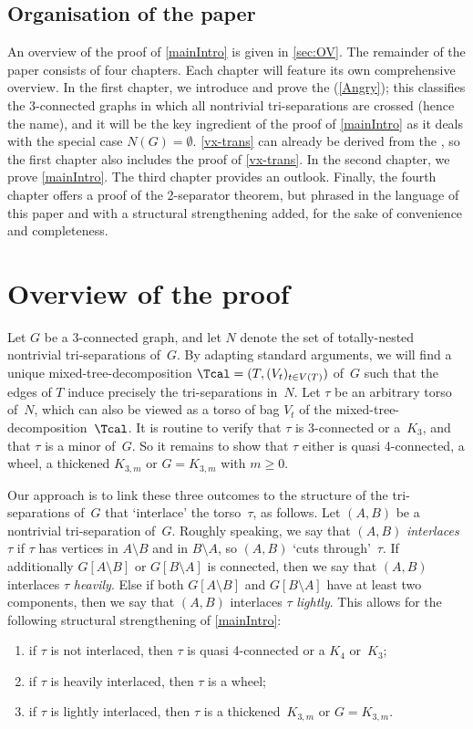 \documentclass{aic}
\theoremstyle{plain}
\theoremstyle{definition}
\theoremstyle{plain}
\theoremstyle{plain}
\newcommand{\sm}{\setminus}
\renewcommand{\ge}{\geqslant}
\begin{document}
\subsection*{Organisation of the paper}
An overview of the proof of \autoref{mainIntro} is given in \autoref{sec:OV}. 
The remainder of the paper consists of four chapters.
Each chapter will feature its own comprehensive overview.
In the first chapter, we introduce and prove the  (\ref{Angry}); this classifies the 3-connected graphs in which all nontrivial tri-separations are crossed (hence the name), and it will be the key ingredient of the proof of \autoref{mainIntro} as it deals with the special case $N(G)=\emptyset$.
\autoref{vx-trans} can already be derived from the , so the first chapter also includes the proof of \autoref{vx-trans}.
In the second chapter, we prove \autoref{mainIntro}.
The third chapter provides an outlook.
Finally, the fourth chapter offers a proof of the 2-separator theorem, but phrased in the language of this paper and with a structural strengthening added, for the sake of convenience and completeness.



\section{Overview of the proof}\label{sec:OV}

Let $G$ be a 3-connected graph, and let $N$ denote the set of totally-nested nontrivial tri-separations of~$G$.
By adapting standard arguments, we will find a unique mixed-tree-decomposition $\Tcal=(T,(V_t)_{t\in V(T)})$ of~$G$ such that the edges of $T$ induce precisely the tri-separations in~$N$.
Let $\tau$ be an arbitrary torso of~$N$, which can also be viewed as a torso of bag $V_t$ of the mixed-tree-decomposition~$\Tcal$.
It is routine to verify that $\tau$ is 3-connected or a~$K_3$, and that $\tau$ is a minor of~$G$.
So it remains to show that $\tau$ either is quasi 4-connected, a wheel, a thickened $K_{3,m}$ or $G=K_{3,m}$ with $m\ge 0$.

Our approach is to link these three outcomes to the structure of the tri-separations of~$G$ that `interlace' the torso~$\tau$, as follows.
Let $(A,B)$ be a nontrivial tri-separation of~$G$.
Roughly speaking, we say that $(A,B)$ \emph{interlaces} $\tau$ if $\tau$ has vertices in $A\sm B$ and in $B\sm A$, so $(A,B)$ `cuts through'~$\tau$.
If additionally $G[A\sm B]$ or $G[B\sm A]$ is connected, then we say that $(A,B)$ interlaces $\tau$ \emph{heavily}.
Else if both $G[A\sm B]$ and $G[B\sm A]$ have at least two components, then we say that $(A,B)$ interlaces $\tau$ \emph{lightly}.
This allows for the following structural strengthening of \autoref{mainIntro}:
\begin{enumerate}
    \item if $\tau$ is not interlaced, then $\tau$ is quasi 4-connected or a $K_4$ or~$K_3$;
    \item if $\tau$ is heavily interlaced, then $\tau$ is a wheel;
    \item if $\tau$ is lightly interlaced, then $\tau$ is a thickened~$K_{3,m}$ or $G=K_{3,m}$.
\end{enumerate}
\end{document}
